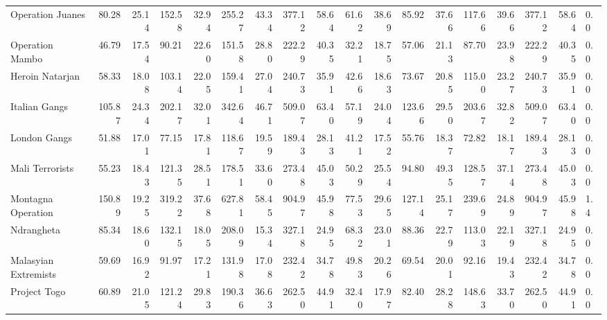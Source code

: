 \begin{tabular}{lrrrrrrrrrrrrrrrrl}
Operation Juanes     &             80.28 &  25.14 &  152.58 &  32.94 &  255.27 &  43.34 &  377.12 &  58.64 &            61.62 &   38.69 &   85.92 &   37.66 &  117.66 &   39.66 &  377.12 &  58.64 &        0.0 \\
Operation Mambo      &             46.79 &  17.54 &   90.21 &  22.60 &  151.58 &  28.80 &  222.29 &  40.35 &            32.21 &   18.75 &   57.06 &   21.13 &   87.70 &   23.98 &  222.29 &  40.35 &        0.0 \\
Heroin Natarjan      &             58.33 &  18.08 &  103.14 &  22.05 &  159.41 &  27.04 &  240.73 &  35.91 &            42.66 &   18.63 &   73.67 &   20.85 &  115.00 &   23.27 &  240.73 &  35.91 &        0.0 \\
Italian Gangs        &            105.87 &  24.34 &  202.17 &  32.01 &  342.64 &  46.71 &  509.07 &  63.40 &            57.19 &   24.04 &  123.66 &   29.50 &  203.67 &   32.82 &  509.07 &  63.40 &        0.0 \\
London Gangs         &             51.88 &  17.01 &   77.15 &  17.81 &  118.67 &  19.59 &  189.43 &  28.13 &            41.21 &   17.52 &   55.76 &   18.37 &   72.82 &   18.17 &  189.43 &  28.13 &        0.0 \\
Mali Terrorists      &             55.23 &  18.43 &  121.35 &  28.51 &  178.51 &  33.60 &  273.48 &  45.03 &            50.29 &   25.54 &   94.80 &   49.35 &  128.57 &   37.14 &  273.48 &  45.03 &        0.0 \\
Montagna Operation   &            150.89 &  19.25 &  319.22 &  37.68 &  627.81 &  58.45 &  904.97 &  45.98 &            77.53 &   29.65 &  127.14 &   25.17 &  239.69 &   24.89 &  904.97 &  45.98 &        1.4 \\
Ndrangheta           &             85.34 &  18.60 &  132.15 &  18.05 &  208.09 &  15.34 &  327.18 &  24.95 &            68.32 &   23.01 &   88.36 &   22.79 &  113.03 &   22.19 &  327.18 &  24.95 &        0.0 \\
Malasyian Extremists &             59.69 &  16.92 &   91.97 &  17.21 &  131.98 &  17.08 &  232.42 &  34.78 &            49.83 &   20.26 &   69.54 &   20.01 &   92.16 &   19.43 &  232.42 &  34.78 &        0.0 \\
Project Togo         &             60.89 &  21.05 &  121.24 &  29.83 &  190.36 &  36.63 &  262.50 &  44.91 &            32.40 &   17.97 &   82.40 &   28.28 &  148.63 &   33.70 &  262.50 &  44.91 &        0.0 \\
\bottomrule
\end{tabular}
